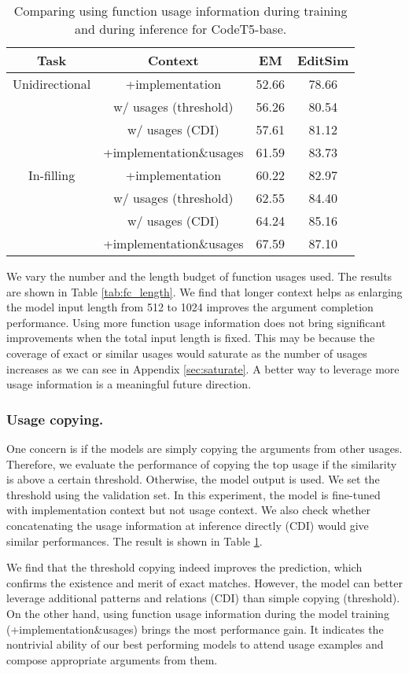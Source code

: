 \begin{table}[ht]
\centering
\small
\begin{tabular}{cccc}
\toprule
Task       & Context                     & EM   & EditSim \\
\midrule
Unidirectional & +implementation         & 52.66 & 78.66 \\
               & w/ usages (threshold)   & 56.26 & 80.54 \\
               & w/ usages (CDI)         & 57.61 & 81.12 \\
               \cmidrule{2-4}
               & +implementation\&usages & 61.59 & 83.73 \\
\midrule
In-filling     & +implementation         & 60.22 & 82.97 \\
               & w/ usages (threshold)   & 62.55 & 84.40 \\
               & w/ usages (CDI)         & 64.24 & 85.16 \\
               \cmidrule{2-4}
               & +implementation\&usages & 67.59 & 87.10  \\
\bottomrule
\end{tabular}
\caption{Comparing using function usage information during training and during inference for CodeT5-base. }
\label{tab:fc_copy}
\end{table}



We vary the number and the length budget of function usages used. 
The results are shown in Table \ref{tab:fc_length}. 
We find that longer context helps as enlarging the model input length from 512 to 1024 improves the argument completion performance.
Using more function usage information does not bring significant improvements when the total input length is fixed. 
This may be because the coverage of exact or similar usages would saturate as the number of usages increases as we can see in Appendix \ref{sec:saturate}. 
A better way to leverage more usage information is a meaningful future direction.

\subsubsection{Usage copying.}
One concern is if the models are simply copying the arguments from other usages. 
Therefore, we evaluate the performance of copying the top usage if the similarity is above a certain threshold. Otherwise, the model output is used. We set the threshold using the validation set. 
In this experiment, the model is fine-tuned with implementation context but not usage context.
We also check whether concatenating the usage information at inference directly (CDI) would give similar performances. 
The result is shown in Table \ref{tab:fc_copy}. 

We find that the threshold copying indeed improves the prediction, which confirms the existence and merit of exact matches. 
However, the model can better leverage additional patterns and relations (CDI) than simple copying (threshold).
On the other hand, using function usage information during the model training (+implementation\&usages) brings the most performance gain. 
It indicates the nontrivial ability of our best performing models to attend usage examples and compose appropriate arguments from them.
